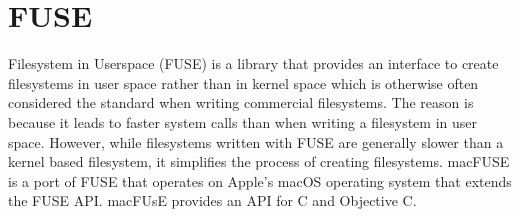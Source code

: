 \section{FUSE}
Filesystem in Userspace (FUSE) is a library that provides an interface to create filesystems in user space rather than in kernel space which is otherwise often considered the standard when writing commercial filesystems\cite{Libfuse2021}. The reason is because it leads to faster system calls than when writing a filesystem in user space. However, while filesystems written with FUSE are generally slower than a kernel based filesystem, it simplifies the process of creating filesystems. macFUSE is a port of FUSE that operates on Apple's macOS operating system that extends the FUSE API\cite{HomeMacFUSE}. macFUsE provides an API for C and Objective C.
